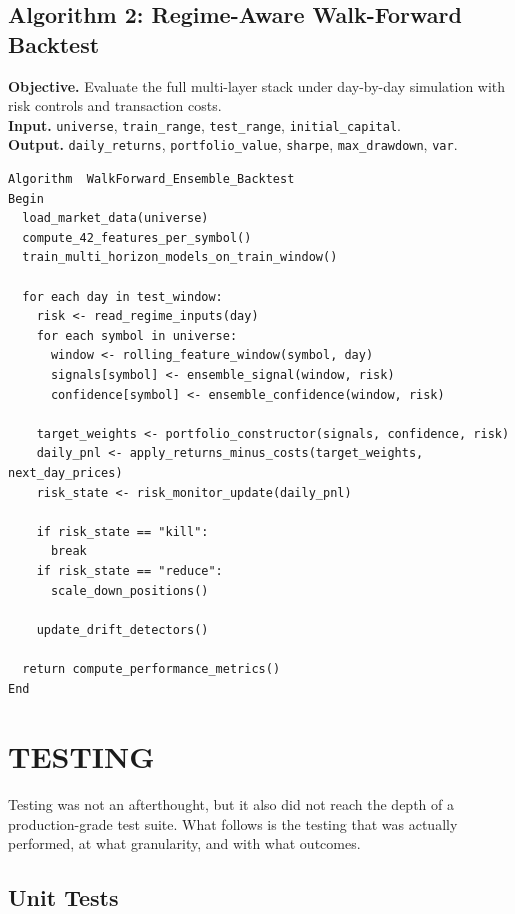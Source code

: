 \documentclass[12pt,a4paper]{report}
\numberwithin{equation}{chapter}
\begin{document}
\subsection{Algorithm 2: Regime-Aware Walk-Forward Backtest}

\textbf{Objective.} Evaluate the full multi-layer stack under day-by-day simulation with risk controls and transaction costs.\\
\textbf{Input.} \texttt{universe}, \texttt{train\_range}, \texttt{test\_range}, \texttt{initial\_capital}.\\
\textbf{Output.} \texttt{daily\_returns}, \texttt{portfolio\_value}, \texttt{sharpe}, \texttt{max\_drawdown}, \texttt{var}.

\begin{lstlisting}[breaklines=true]
Algorithm  WalkForward_Ensemble_Backtest
Begin
  load_market_data(universe)
  compute_42_features_per_symbol()
  train_multi_horizon_models_on_train_window()

  for each day in test_window:
    risk <- read_regime_inputs(day)
    for each symbol in universe:
      window <- rolling_feature_window(symbol, day)
      signals[symbol] <- ensemble_signal(window, risk)
      confidence[symbol] <- ensemble_confidence(window, risk)

    target_weights <- portfolio_constructor(signals, confidence, risk)
    daily_pnl <- apply_returns_minus_costs(target_weights, next_day_prices)
    risk_state <- risk_monitor_update(daily_pnl)

    if risk_state == "kill":
      break
    if risk_state == "reduce":
      scale_down_positions()

    update_drift_detectors()

  return compute_performance_metrics()
End
\end{lstlisting}

\section{TESTING}

Testing was not an afterthought, but it also did not reach the depth of a production-grade test suite. What follows is the testing that was actually performed, at what granularity, and with what outcomes.

\subsection{Unit Tests}
\end{document}
